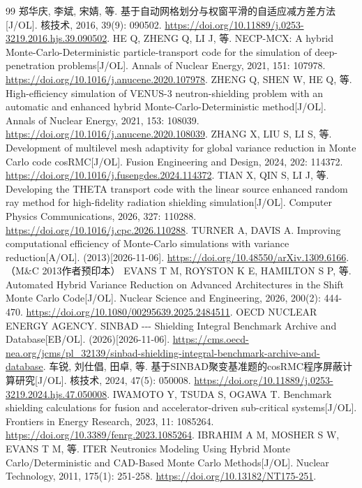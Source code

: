 \documentclass[UTF8, zihao=-4, fontset=none, a4paper]{ctexart}
\begin{document}
\begin{thebibliography}{99}
 郑华庆, 李斌, 宋婧, 等. 基于自动网格划分与权窗平滑的自适应减方差方法{[}J/OL{]}. 核技术, 2016, 39(9): 090502. \url{https://doi.org/10.11889/j.0253-3219.2016.hjs.39.090502}.
 HE Q, ZHENG Q, LI J, 等. NECP-MCX: A hybrid Monte-Carlo-Deterministic particle-transport code for the simulation of deep-penetration problems{[}J/OL{]}. Annals of Nuclear Energy, 2021, 151: 107978. \url{https://doi.org/10.1016/j.anucene.2020.107978}.
 ZHENG Q, SHEN W, HE Q, 等. High-efficiency simulation of VENUS-3 neutron-shielding problem with an automatic and enhanced hybrid Monte-Carlo-Deterministic method{[}J/OL{]}. Annals of Nuclear Energy, 2021, 153: 108039. \url{https://doi.org/10.1016/j.anucene.2020.108039}.
 ZHANG X, LIU S, LI S, 等. Development of multilevel mesh adaptivity for global variance reduction in Monte Carlo code cosRMC{[}J/OL{]}. Fusion Engineering and Design, 2024, 202: 114372. \url{https://doi.org/10.1016/j.fusengdes.2024.114372}.
 TIAN X, QIN S, LI J, 等. Developing the THETA transport code with the linear source enhanced random ray method for high-fidelity radiation shielding simulation{[}J/OL{]}. Computer Physics Communications, 2026, 327: 110288. \url{https://doi.org/10.1016/j.cpc.2026.110288}.
 TURNER A, DAVIS A. Improving computational efficiency of Monte-Carlo simulations with variance reduction{[}A/OL{]}. (2013)[2026-11-06]. \url{https://doi.org/10.48550/arXiv.1309.6166}.（M\&C 2013作者预印本）
 EVANS T M, ROYSTON K E, HAMILTON S P, 等. Automated Hybrid Variance Reduction on Advanced Architectures in the Shift Monte Carlo Code{[}J/OL{]}. Nuclear Science and Engineering, 2026, 200(2): 444-470. \url{https://doi.org/10.1080/00295639.2025.2484511}.
 OECD NUCLEAR ENERGY AGENCY. SINBAD -\/-\/- Shielding Integral Benchmark Archive and Database{[}EB/OL{]}. (2026)[2026-11-06]. \url{https://cms.oecd-nea.org/jcms/pl_32139/sinbad-shielding-integral-benchmark-archive-and-database}.
 车锐, 刘仕倡, 田卓, 等. 基于SINBAD聚变基准题的cosRMC程序屏蔽计算研究{[}J/OL{]}. 核技术, 2024, 47(5): 050008. \url{https://doi.org/10.11889/j.0253-3219.2024.hjs.47.050008}.
 IWAMOTO Y, TSUDA S, OGAWA T. Benchmark shielding calculations for fusion and accelerator-driven sub-critical systems{[}J/OL{]}. Frontiers in Energy Research, 2023, 11: 1085264. \url{https://doi.org/10.3389/fenrg.2023.1085264}.
 IBRAHIM A M, MOSHER S W, EVANS T M, 等. ITER Neutronics Modeling Using Hybrid Monte Carlo/Deterministic and CAD-Based Monte Carlo Methods{[}J/OL{]}. Nuclear Technology, 2011, 175(1): 251-258. \url{https://doi.org/10.13182/NT175-251}.

\end{thebibliography}
\end{document}
